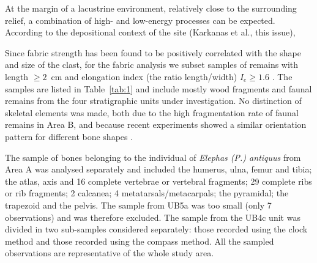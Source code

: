 \documentclass[preprint,authoryear,times]{elsarticle} %
\begin{document}
At the margin of a lacustrine environment, relatively close to the surrounding relief, a combination of high- and low-energy processes can be expected. According to the depositional context of the site (Karkanas et al., this issue), %
 

Since fabric strength has been found to be positively correlated with the shape and size of the clast, for the fabric analysis we subset samples of remains with length $\geq2$~cm and elongation index (the ratio length/width) $I_{e}\geq1.6$ \citep{Lenoble2004}. The samples are listed in Table~\ref{tab:1} and include mostly wood fragments %
and faunal remains from the four stratigraphic units under investigation. %
No distinction of skeletal elements was made, both due to the high fragmentation rate of faunal remains in Area B, and because recent experiments showed a similar orientation pattern for different bone shapes \citep{Dominguez-Rodrigo2012,Dominguez-Rodrigo2013}. %

The sample of bones belonging to the individual of \emph{Elephas (P.) antiquus} from Area A was analysed separately and included the humerus, ulna, femur and tibia; the atlas, axis and 16 complete vertebrae or vertebral fragments; 29 complete ribs or rib fragments; 2 calcanea; 4 metatarsals/metacarpals; the pyramidal; the trapezoid and the pelvis. The sample from UB5a was too small (only 7 observations) and was therefore excluded. The sample from the UB4c unit was divided in two sub-samples considered separately: those recorded using the clock method and those recorded using the compass method. All the sampled observations are representative of the whole study area.
\end{document}
